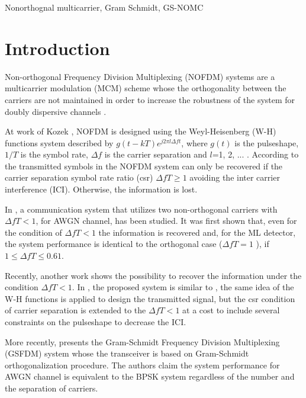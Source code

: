 \documentclass[draftcls,12pt, onecolumn, twoside]{IEEEtran}
\begin{document}
\begin{keywords}
Nonorthognal multicarrier, Gram Schmidt, GS-NOMC \\
\end{keywords}



\newpage

\section{Introduction}
Non-orthogonal Frequency Division Multiplexing (NOFDM) systems are  a multicarrier modulation (MCM) scheme whose the orthogonality between the carriers are not maintained in order to increase the robustness of the system for doubly dispersive channels \cite{Kozek,Fang}. 

At work of Kozek \cite{Kozek}, NOFDM is designed using the Weyl-Heisenberg (W-H) functions system described by $g(t-kT)e^{j2\pi l\Delta ft}$, where $g(t)$ is the pulseshape, $1/T$ is the symbol rate, $\Delta f$ is the carrier separation and $l$=1, 2, ... . According to \cite{Kozek} the transmitted symbols in the NOFDM system can only be recovered if the carrier separation symbol rate ratio (csr) $\Delta fT\geq1$ avoiding the inter carrier interference (ICI). Otherwise, the information is lost.  

In \cite{Lucena}, a communication system that utilizes two non-orthogonal carriers with $\Delta fT < 1$, for AWGN channel, has been studied. It was first shown that, even for the condition of $\Delta fT<1$ the information is recovered and, for the ML detector, the system performance is identical to the orthogonal  case ($\Delta fT=1$ ), if $1\leq \Delta fT \leq 0.61$.

Recently, another work \cite{Fang} shows the possibility to recover the information under the condition $\Delta fT<1$. In \cite{Fang}, the proposed system is similar to \cite{Kozek}, the same idea of the W-H functions is applied to design the transmitted signal, but the csr condition of carrier separation is extended to the $\Delta fT<1$ at a cost to include several constraints on the pulseshape to decrease the ICI.

More recently, \cite{Zhang} presents the Gram-Schmidt Frequency Division Multiplexing (GSFDM) system whose the transceiver is based on Gram-Schmidt orthogonalization procedure. The authors claim the system performance for AWGN channel is equivalent to the BPSK system regardless of the number and the separation of carriers. 
\end{document}
